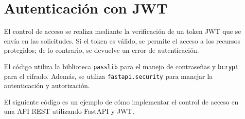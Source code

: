 \chapter{Autenticación con JWT}

\label{AppendixB}
El control de acceso se realiza mediante la verificación de un token JWT que se
envía en las solicitudes. Si el token es válido, se permite el acceso a los
recursos protegidos; de lo contrario, se devuelve un error de autenticación.

El código utiliza la biblioteca \texttt{passlib} para el manejo de contraseñas
y \texttt{bcrypt} para el cifrado. Además, se utiliza \texttt{fastapi.security}
para manejar la autenticación y autorización.

El siguiente código es un ejemplo de cómo implementar el control de acceso en
una API REST utilizando FastAPI y JWT. 


